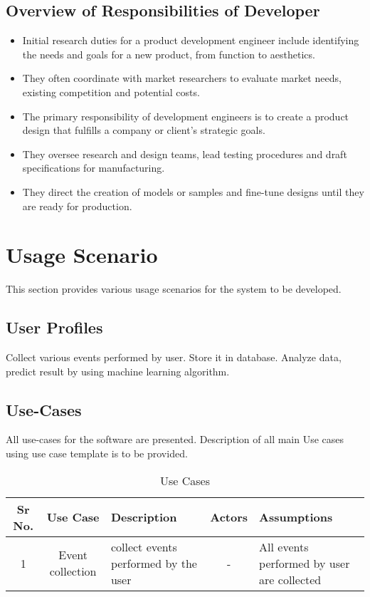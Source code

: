 \documentclass[oneside,a4paper,12pt]{book}
\begin{document}
\begin{enumerate}
\subsection{Overview of Responsibilities of Developer}
\begin{itemize}
\item Initial research duties for a product development engineer include identifying the needs and goals for a new product, from function to aesthetics.

\item They often coordinate with market researchers to evaluate market needs, existing competition and potential costs.

\item The primary responsibility of development engineers is to create a product design that fulfills a company or client’s strategic goals.

\item They oversee research and design teams, lead testing procedures and draft specifications for manufacturing.

\item They direct the creation of models or samples and fine-tune designs until they are ready for production.
\end{itemize}  
  
\section{Usage Scenario}
This section provides various usage scenarios for the system to be developed.  
 \subsection{User Profiles}  
\begin{itemize}
Collect various events performed by user. Store it in database. Analyze data, predict result by using machine learning algorithm. 

\subsection{Use-Cases}
All use-cases for the software are presented. Description of all main Use cases using use case template is to be provided.

\begin{table}[!htbp]
\begin{center}
\def\arraystretch{1.5}
\begin{tabularx}{\textwidth}{| c | c | X | c | X |}
\hline
Sr No.	& Use Case	& Description	& Actors	& Assumptions \\
\hline
1& Event collection & collect events performed by the user &- & All events performed by user are collected \\
\hline
\end{tabularx}
\end{center}
\caption{Use Cases}
\label{tab:usecase}
\end{table}



\end{itemize}
\end{enumerate}
\end{document}
